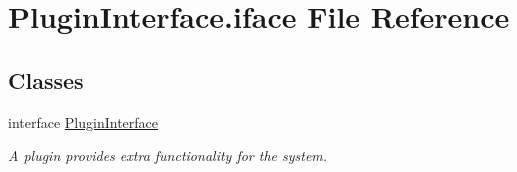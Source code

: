 \hypertarget{PluginInterface_8iface}{\section{Plugin\-Interface.\-iface File Reference}
\label{PluginInterface_8iface}
}
\subsection*{Classes}
\begin{DoxyCompactItemize}
\item 
interface \hyperlink{interfacePluginInterface}{Plugin\-Interface}
\begin{DoxyCompactList}\small\item\em A plugin provides extra functionality for the system. \end{DoxyCompactList}\end{DoxyCompactItemize}
